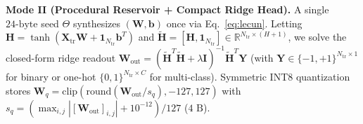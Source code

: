 \textbf{Mode II (Procedural Reservoir + Compact Ridge Head).} A single $24\text{-byte}$ seed $\Theta$ synthesizes $(\mathbf{W},\mathbf{b})$ once via Eq.~\eqref{eq:lecun}. Letting $\mathbf{H} = \tanh(\mathbf{X}_{\mathrm{tr}}\mathbf{W} + \mathbf{1}_{N_{\mathrm{tr}}}\mathbf{b}^T)$ and $\tilde{\mathbf{H}} = [\mathbf{H}, \mathbf{1}_{N_{\mathrm{tr}}}] \in \mathbb{R}^{N_{\mathrm{tr}}\times(H+1)}$, we solve the closed-form ridge readout $\mathbf{W}_{\mathrm{out}} = (\tilde{\mathbf{H}}^T\tilde{\mathbf{H}} + \lambda\mathbf{I})^{-1}\tilde{\mathbf{H}}^T\mathbf{Y}$ (with $\mathbf{Y}\in\{-1,+1\}^{N_{\mathrm{tr}}\times 1}$ for binary or one-hot $\{0,1\}^{N_{\mathrm{tr}}\times C}$ for multi-class). Symmetric INT8 quantization stores $\mathbf{W}_q = \mathrm{clip}(\mathrm{round}(\mathbf{W}_{\mathrm{out}}/s_q), -127, 127)$ with $s_q = (\max_{i,j}|[\mathbf{W}_{\mathrm{out}}]_{i,j}|+10^{-12})/127$ ($4\text{ B}$).

